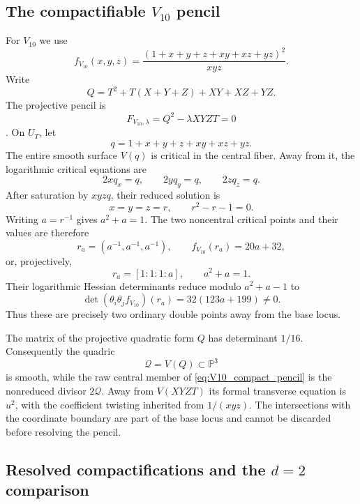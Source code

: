 \documentclass[11pt]{amsart}
\theoremstyle{definition}
\theoremstyle{remark}
\begin{document}
\subsection{The compactifiable \texorpdfstring{$V_{10}$}{V10} pencil}

For $V_{10}$ we use
\begin{equation}
\label{eq:V10_compact_torus}
f_{V_{10}}(x,y,z)
=
\frac{(1+x+y+z+xy+xz+yz)^2}{xyz}.
\end{equation}
Write
\[
Q=T^2+T(X+Y+Z)+XY+XZ+YZ.
\]
The projective pencil is
\begin{equation}
\label{eq:V10_compact_pencil}
F_{V_{10},\lambda}=Q^2-\lambda XYZT=0
\end{equation}
\cite{PrzyjalkowskiWeak,Przyjalkowski2026}.  On $U_T$, let
\[
q=1+x+y+z+xy+xz+yz.
\]
The entire smooth surface $V(q)$ is critical in the central fiber.  Away
from it, the logarithmic critical equations are
\begin{equation}
\label{eq:V10_saturated_critical_equations}
2xq_x=q,
\qquad
2yq_y=q,
\qquad
2zq_z=q.
\end{equation}
After saturation by $xyzq$, their reduced solution is
\[
x=y=z=r,
\qquad
r^2-r-1=0.
\]
Writing $a=r^{-1}$ gives $a^2+a=1$.  The two noncentral critical points and
their values are therefore
\[
r_a=(a^{-1},a^{-1},a^{-1}),
\qquad
f_{V_{10}}(r_a)=20a+32,
\]
or, projectively,
\begin{equation}
\label{eq:V10_compact_nodes}
r_a=[1:1:1:a],
\qquad
a^2+a=1.
\end{equation}
Their logarithmic Hessian determinants reduce modulo $a^2+a-1$ to
\begin{equation}
\label{eq:V10_compact_hessian}
\det(\theta_i\theta_jf_{V_{10}})(r_a)
=32(123a+199)\neq0.
\end{equation}
Thus these are precisely two ordinary double points away from the base locus.

The matrix of the projective quadratic form $Q$ has determinant $1/16$.
Consequently the quadric
\[
\mathcal Q=V(Q)\subset\mathbb P^3
\]
is smooth, while the raw central member of
\eqref{eq:V10_compact_pencil} is the nonreduced divisor $2\mathcal Q$.
Away from $V(XYZT)$ its formal transverse equation is $u^2$, with the
coefficient twisting inherited from $1/(xyz)$.  The intersections with the
coordinate boundary are part of the base locus and cannot be discarded
before resolving the pencil.

\subsection{Resolved compactifications and the \texorpdfstring{$d=2$}{d=2} comparison}
\end{document}
